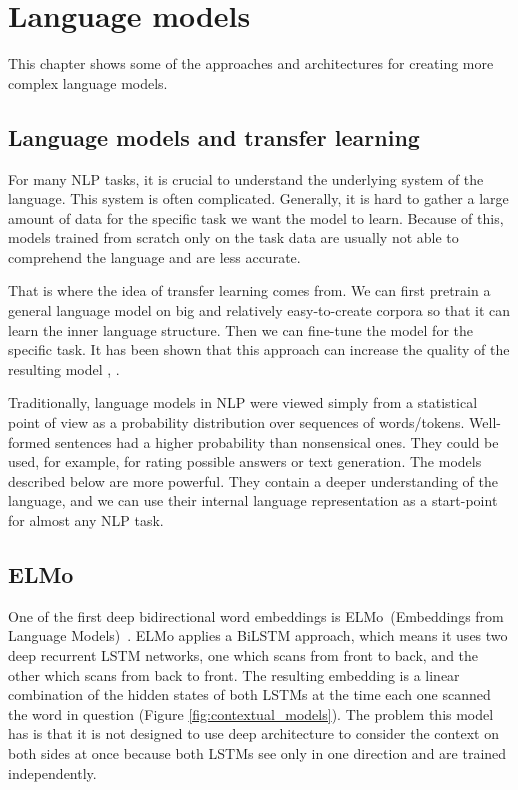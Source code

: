 \documentclass[
  printed, %
  color,   %
  table,   %
  oneside, %
  lof,     %
  lot,     %
]{fithesis3}
\begin{document}

\chapter{Language models}
This chapter shows some of the approaches and architectures for creating more complex language models.

\section{Language models and transfer learning}
For many NLP tasks, it is crucial to understand the underlying system of the language. This system is often complicated. Generally, it is hard to gather a large amount of data for the specific task we want the model to learn. Because of this, models trained from scratch only on the task data are usually not able to comprehend the language and are less accurate.

That is where the idea of transfer learning comes from. We can first pretrain a general language model on big and relatively easy-to-create corpora so that it can learn the inner language structure. Then we can fine-tune the model for the specific task. It has been shown that this approach can increase the quality of the resulting model \parencite{transfer1}, \parencite{transfer2}.

Traditionally, language models in NLP were viewed simply from a statistical point of view as a probability distribution over sequences of words/tokens. Well-formed sentences had a higher probability than nonsensical ones. They could be used, for example, for rating possible answers or text generation. The models described below are more powerful. They contain a deeper understanding of the language, and we can use their internal language representation as a start-point for almost any NLP task.

 \section{ELMo}
One of the first deep bidirectional word embeddings is ELMo~(Embeddings from Language Models)~\parencite{elmo}. ELMo applies a BiLSTM approach, which means it uses two deep recurrent LSTM networks, one which scans from front to back, and the other which scans from back to front. The resulting embedding is a linear combination of the hidden states of both LSTMs at the time each one scanned the word in question (Figure \ref{fig:contextual_models}). The problem this model has is that it is not designed to use deep architecture to consider the context on both sides at once because both LSTMs see only in one direction and are trained independently. 
\end{document}
